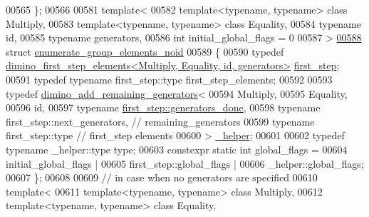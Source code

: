 \begin{DoxyCode}
00565 \};
00566 
00581 \textcolor{keyword}{template}<
00582   \textcolor{keyword}{template}<\textcolor{keyword}{typename}, \textcolor{keyword}{typename}> \textcolor{keyword}{class }Multiply,
00583   \textcolor{keyword}{template}<\textcolor{keyword}{typename}, \textcolor{keyword}{typename}> \textcolor{keyword}{class }Equality,
00584   \textcolor{keyword}{typename} id,
00585   \textcolor{keyword}{typename} generators,
00586   \textcolor{keywordtype}{int} initial\_global\_flags = 0
00587 >
\hyperlink{struct_eigen_1_1internal_1_1group__theory_1_1enumerate__group__elements__noid}{00588} \textcolor{keyword}{struct }\hyperlink{struct_eigen_1_1internal_1_1group__theory_1_1enumerate__group__elements__noid}{enumerate\_group\_elements\_noid}
00589 \{
00590   \textcolor{keyword}{typedef} \hyperlink{struct_eigen_1_1internal_1_1group__theory_1_1dimino__first__step__elements}{dimino\_first\_step\_elements<Multiply, Equality, id, generators>}
       \hyperlink{struct_eigen_1_1internal_1_1group__theory_1_1dimino__first__step__elements}{first\_step};
00591   \textcolor{keyword}{typedef} \textcolor{keyword}{typename} first\_step::type first\_step\_elements;
00592 
00593   \textcolor{keyword}{typedef} \hyperlink{struct_eigen_1_1internal_1_1group__theory_1_1dimino__add__remaining__generators}{dimino\_add\_remaining\_generators}<
00594     Multiply,
00595     Equality,
00596     id,
00597     \textcolor{keyword}{typename} \hyperlink{struct_eigen_1_1internal_1_1type__list}{first\_step::generators\_done},
00598     \textcolor{keyword}{typename} first\_step::next\_generators, \textcolor{comment}{// remaining\_generators}
00599     \textcolor{keyword}{typename} first\_step::type \textcolor{comment}{// first\_step elements}
00600   > \hyperlink{struct_eigen_1_1internal_1_1group__theory_1_1dimino__add__remaining__generators}{\_helper};
00601 
00602   \textcolor{keyword}{typedef} \textcolor{keyword}{typename} \_helper::type type;
00603   constexpr \textcolor{keyword}{static} \textcolor{keywordtype}{int} global\_flags =
00604     initial\_global\_flags |
00605     first\_step::global\_flags |
00606     \_helper::global\_flags;
00607 \};
00608 
00609 \textcolor{comment}{// in case when no generators are specified}
00610 \textcolor{keyword}{template}<
00611   \textcolor{keyword}{template}<\textcolor{keyword}{typename}, \textcolor{keyword}{typename}> \textcolor{keyword}{class }Multiply,
00612   \textcolor{keyword}{template}<\textcolor{keyword}{typename}, \textcolor{keyword}{typename}> \textcolor{keyword}{class }Equality,

\end{DoxyCode}
